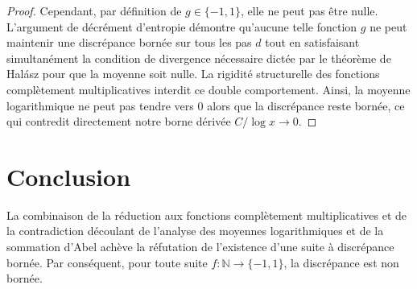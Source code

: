 \documentclass[12pt]{article}
\begin{document}
\begin{proof}
Cependant, par d\'efinition de $g \in \{-1, 1\}$, elle ne peut pas \^etre nulle. L'argument de d\'ecr\'ement d'entropie d\'emontre qu'aucune telle fonction $g$ ne peut maintenir une discr\'epance born\'ee sur tous les pas $d$ tout en satisfaisant simultan\'ement la condition de divergence n\'ecessaire dict\'ee par le th\'eor\`eme de Hal\'asz pour que la moyenne soit nulle. La rigidit\'e structurelle des fonctions compl\`etement multiplicatives interdit ce double comportement. Ainsi, la moyenne logarithmique ne peut pas tendre vers 0 alors que la discr\'epance reste born\'ee, ce qui contredit directement notre borne d\'eriv\'ee $C / \log x \to 0$.
\end{proof}

\section{Conclusion}

La combinaison de la r\'eduction aux fonctions compl\`etement multiplicatives et de la contradiction d\'ecoulant de l'analyse des moyennes logarithmiques et de la sommation d'Abel ach\`eve la r\'efutation de l'existence d'une suite \`a discr\'epance born\'ee. Par cons\'equent, pour toute suite $f : \mathbb{N} \to \{-1, 1\}$, la discr\'epance est non born\'ee.
\end{document}
